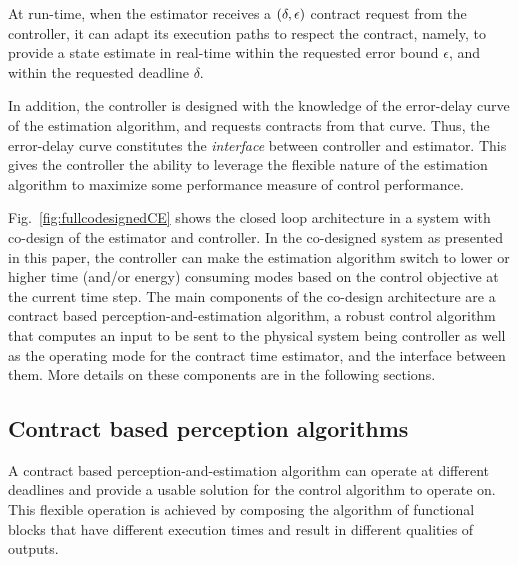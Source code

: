 At run-time, when the estimator receives a $(\delta,\epsilon)$ contract request from the controller, it can adapt its execution paths to respect the contract, namely, to provide a state estimate in real-time within the requested error bound $\epsilon$, and within the requested deadline $\delta$.

In addition, the controller is designed with the knowledge of the error-delay curve of the estimation algorithm, and requests contracts from that curve.
Thus, the error-delay curve constitutes the \textit{interface} between controller and estimator.
This gives the controller the ability to leverage the flexible nature of the estimation algorithm to maximize some performance measure of control performance. %

Fig.~\ref{fig:fullcodesignedCE} shows the closed loop architecture in a system with co-design of the estimator and controller.
In the co-designed system as presented in this paper, the controller can make the estimation algorithm switch to lower or higher time (and/or energy) consuming modes based on the control objective at the current time step.
The main components of the co-design architecture are a contract based perception-and-estimation algorithm, a robust control algorithm that computes an input to be sent to the physical system being controller as well as the operating mode for the contract time estimator, and the interface between them. More details on these components are in the following sections.

\subsection{Contract based perception algorithms}

A contract based perception-and-estimation algorithm can operate at different deadlines and provide a usable solution for the control algorithm to operate on. This flexible operation is achieved by composing the algorithm of functional blocks that have different execution times and result in different qualities of outputs. 

